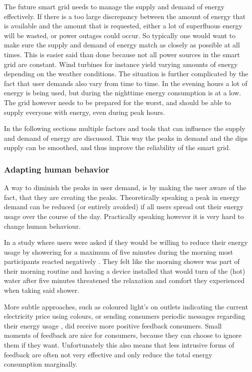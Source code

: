 The future smart grid needs to manage the supply and demand of energy effectively. If there is a too large discrepancy between the amount of energy that is available and the amount that is requested, either a lot of superfluous energy will be wasted, or power outages could occur.
So typically one would want to make sure the supply and demand of energy match as closely as possible at all times. This is easier said than done because not all power sources in the smart grid are constant. Wind turbines for instance yield varying amounts of energy depending on the weather conditions. The situation is further complicated by the fact that user demands also vary from time to time. In the evening hours a lot of energy is being used, but during the nighttime energy consumption is at a low. The grid however needs to be prepared for the worst, and should be able to supply everyone with energy, even during peak hours.

In the following sections multiple factors and tools that can influence the supply and demand of energy are discussed. This way the peaks in demand and the dips supply can be smoothed, and thus improve the reliability of the smart grid.

\subsubsection{Adapting human behavior}

A way to diminish the peaks in user demand, is by making the user aware of the fact, that they are creating the peaks. Theoretically speaking a peak in energy demand can be reduced (or entirely avoided) if all users spread out their energy usage over the course of the day. Practically speaking however it is very hard to change human behaviour.

In a study where users were asked if they would be willing to reduce their energy usage by showering for a maximum of five minutes during the morning most participants reacted negatively \cite{GouldenBedwellRennick-EgglestoneEtAl2014}. They felt like the morning shower was part of their morning routine and having a device installed that would turn of the (hot) water after five minutes threatened the relaxation and comfort they experienced when taking said shower. 

More subtle approaches, such as coloured light's on outlets indicating the current electricity price using colours, or sending consumers periodic messages regarding their energy usage \cite{AyresRasemanShih2012}, did receive more positive feedback consumers. Small moments of feedback are nice for consumers, because they can choose to ignore them if they want. Unfortunately this also means that less intrusive forms of feedback are often not very effective and only reduce the total energy consumption marginally.

